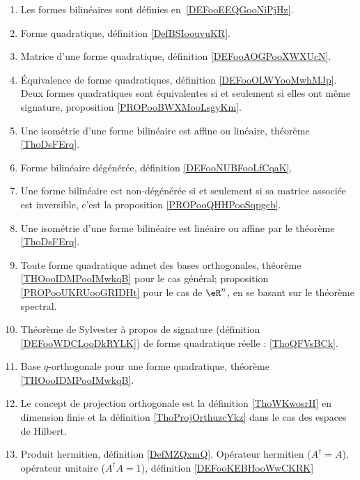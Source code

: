 
      \label{THEMEooOAJKooEvcCVn}
\begin{enumerate}
	\item
	      Les formes bilinéaires sont définies en~\ref{DEFooEEQGooNiPjHz}.
	\item
	      Forme quadratique, définition \ref{DefBSIoouvuKR}.
	\item
	      Matrice d'une forme quadratique, définition \ref{DEFooAOGPooXWXUcN}.
	\item
	      Équivalence de forme quadratiques, définition \ref{DEFooOLWYooMwhMJp}. Deux formes quadratiques sont équivalentes si et seulement si elles ont même signature, proposition \ref{PROPooBWXMooLsgyKm}.
	\item
	      Une isométrie d'une forme bilinéaire est affine ou linéaire, théorème \ref{ThoDsFErq}.
	\item
	      Forme bilinéaire dégénérée, définition \ref{DEFooNUBFooLfCqaK}.
	\item
	      Une forme bilinéaire est non-dégénérée si et seulement si sa matrice associée est inversible, c'est la proposition \ref{PROPooQHHPooSqpgcb}.
	\item
	      Une isométrie d'une forme bilinéaire est linéaire ou affine par le théorème \ref{ThoDsFErq}.
	\item
	      Toute forme quadratique admet des bases orthogonales, théorème \ref{THOooIDMPooIMwkqB} pour le cas général; proposition \ref{PROPooUKRUooGRIDHt} pour le cas de \( \eR^n\), en se basant sur le théorème spectral.
	\item
	      Théorème de Sylvester à propos de signature (définition \ref{DEFooWDCLooDkRYLK}) de forme quadratique réelle : \ref{ThoQFVsBCk}.
	\item
	      Base \( q\)-orthogonale pour une forme quadratique, théorème \ref{THOooIDMPooIMwkqB}.
	\item
	      Le concept de projection orthogonale est la définition \ref{ThoWKwosrH} en dimension finie et la définition \ref{ThoProjOrthuzcYkz} dans le cas des espaces de Hilbert.
      \item
          Produit hermitien, définition \ref{DefMZQxmQ}. Opérateur hermitien (\( A^{\dag}=A\)), opérateur unitaire (\( A^{\dag}A=1\)), définition \ref{DEFooKEBHooWwCKRK}
\end{enumerate}

